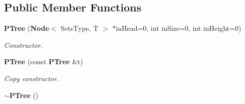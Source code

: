 \subsection*{Public Member Functions}
\begin{CompactItemize}
\item 
{\bf PTree} ({\bf Node}$<$ Sets\-Type, T $>$ $\ast$in\-Head=0, int in\-Size=0, int in\-Height=0)\label{class_p_tree_36e06775df6b20cad49bc53612744f33}

\begin{CompactList}\small\item\em Constructor. \item\end{CompactList}\item 
{\bf PTree} (const {\bf PTree} \&t)\label{class_p_tree_baf9201e7e17e366e1daaf82e4c059c5}

\begin{CompactList}\small\item\em Copy constructor. \item\end{CompactList}\item 
{\bf $\sim$PTree} ()\label{class_p_tree_8d8d9d39e2e7cea5c88c56a6e2d99f83}


\end{CompactItemize}
